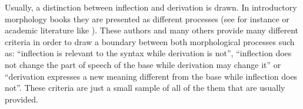 \documentclass[12pt]{article}
\begin{document}



Usually, a distinction between inflection and derivation is drawn. In introductory morphology books they are presented as different processes (see for instance \textcite{aronoff2011WhatMorphology, booij2012GrammarWordsIntroduction,haspelmath2013UnderstandingMorphology} or academic literature like \textcite{booij2006InflectionDerivation,stump2005WordFormationInflectionalMorphology,stump2017Inflection}). These authors and many others provide many different criteria in order to draw a boundary between both morphological processes such as: \enquote{inflection is relevant to the syntax while derivation is not}, \enquote{inflection does not change the part of speech of the base while derivation may change it} or \enquote{derivation expresses a new meaning different from the base while inflection does not}. These criteria are just a small sample of all of the them that are usually provided. %
\end{document}
